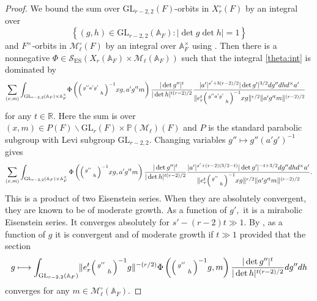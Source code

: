 \documentclass[12pt]{amsart}
\theoremstyle{remark}
\numberwithin{equation}{section}
\newcommand{\A}{\mathbb{A}}
\newcommand{\GL}{\mathrm{GL}}
\newcommand{\RR}{\mathbb{R}}
\theoremstyle{definition}
\newenvironment{psmatrix}
  {\left(\begin{smallmatrix}}
  {\end{smallmatrix}\right)}
\numberwithin{equation}{subsection}
\newcommand{\norm}[1]{\lVert#1\rVert}
\begin{document}
\begin{proof}
We bound the sum over $\GL_{r-2,2}(F)$-orbits in $X_r^\circ(F)$ by an integral over 
$$
 \left\{(g,h) \in \GL_{r-2,2}(\A_F): |\det g\det h|=1\right\}
$$ 
and $F^\times$-orbits in $\mathcal{M}_{\ell}^\circ(F)$ by an integral over $\A_F^\times$ using \cite[Lemma 3.3]{FinisLapid2011}.  Then there is a nonnegative $\Phi \in \mathcal{S}_{\mathrm{ES}}(X_r(\A_F) \times \mathcal{M}_{\ell}(\A_F))$ such that the integral \eqref{theta:int} is dominated by 
\begin{align*}
    \sum_{(x,m)}\int_{\GL_{r-2,2}(\mathbb{A}_F)\times \mathbb{A}_F^\times}&\Phi
    \left( \begin{psmatrix} g''a'g' & \\ & h\end{psmatrix}^{-1}xg,a'g'^{t}m\right)\frac{|\det g''|^t}{|\det h|^{t(r-2)/2}} \frac{|a'|^{s'+3(r-2)/2}|\det g'|^{3/2}dg''dhd^\times a'}{\norm{e_r^t\begin{psmatrix} g''a'g' & \\ & h\end{psmatrix}^{-1}xg}^{r/2}\norm{ a'g'^tm}^{(r-2)/2}} 
\end{align*}
for any $t \in \RR.$ 
Here the sum is over $(x,m) \in P(F) \backslash \GL_r(F) \times \mathbb{P}(\mathcal{M}_{\ell})(F)$ and $P$ is the standard parabolic subgroup with Levi subgroup $\GL_{r-2,2}.$ Changing variables $g'' \mapsto g''(a'g')^{-1}$ gives 
\begin{align*}
    \sum_{(x,m)}\int_{\GL_{r-2,2}(\mathbb{A}_F)\times \mathbb{A}_F^\times}\Phi\left( \begin{psmatrix} g'' & \\ & h\end{psmatrix}^{-1}xg,a'g'^{t}m\right)\frac{|\det g''|^{t}}{|\det h|^{t(r-2)/2}}\frac{|a'|^{s'+(r-2)(3/2-t)}|\det g'|^{-t+3/2}dg''dhd^\times a'}{\norm{e_r^t\begin{psmatrix} g'' & \\ & h\end{psmatrix}^{-1}xg}^{r/2}\norm{ a'g'^tm}^{(r-2)/2}} .
\end{align*}
This is a product of two Eisenstein series.  When they are absolutely convergent, they are known to be of moderate growth. As a function of $g',$ it is a mirabolic Eisenstein series.  It converges absolutely for $s'-(r-2)t \gg 1.$  By \cite[\S II.1.5]{MW:Spectral:Decomp:ES},  as a function of $g$ it is convergent and of moderate growth if $t \gg 1$ provided that the section
\begin{align*}
g \longmapsto \int_{\GL_{r-2,2}(\A_F)} \norm{e_r^t\begin{psmatrix} g'' & \\ & h\end{psmatrix}^{-1}g}^{-(r/2)}\Phi\left(\begin{psmatrix} g'' & \\ & h\end{psmatrix}^{-1} g,m\right)\frac{|\det g''|^t}{|\det h|^{t(r-2)/2}}dg''dh
\end{align*}
converges  for any $m \in \mathcal{M}_\ell^\circ(\A_F).$


\end{proof}
\end{document}
